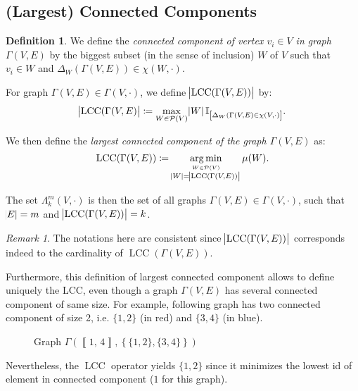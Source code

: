 \documentclass{article}
\theoremstyle{definition}
\newtheorem{definition}[lemma]{Definition}
\theoremstyle{remark}
\newtheorem*{remark}{Remark}
\DeclareMathOperator{\LCC}{LCC}
\DeclareMathOperator*{\argmin}{arg\,min}
\newcommand{\intint}[2]{\left\llbracket#1, \, #2\right\rrbracket}
\begin{document}
	\subsection{(Largest) Connected Components}
		\begin{definition} We define the \textit{connected component of vertex $v_i \in V$ in graph $\Gamma(V, E)$} by the biggest subset (in the sense of inclusion) $W$
		of $V$ such that $v_i \in W$ and $\Delta_W(\Gamma(V, E)) \in \chi(W, \cdot)$.

		For graph $\Gamma(V, E) \in \Gamma(V, \cdot)$, we define $\abs {\LCC(\Gamma(V, E))}$ by:
		\[\abs {\LCC(\Gamma(V, E)} \coloneqq \max_{W \in \mathcal P(V)}\abs W\mathbb I_{\left[\Delta_W(\Gamma(V, E) \in \chi(V, \cdot)\right]}.\]

		We then define the \textit{largest connected component of the graph $\Gamma(V, E)$} as:
		\[\LCC(\Gamma(V, E)) \coloneqq \argmin_{\stackrel {W \in \mathcal P(V)}{\abs W = \abs {\LCC(\Gamma(V, E))}}} \mu(W).\]

		The set $\Lambda_k^m(V, \cdot)$ is then the set of all graphs $\Gamma(V, E) \in \Gamma(V, \cdot)$, such that $\abs E = m$ and $\abs {\LCC(\Gamma(V, E))} = k$.
		\end{definition}

		\begin{remark} The notations here are consistent since $\abs {\LCC(\Gamma(V, E))}$ corresponds indeed to the cardinality of $\LCC(\Gamma(V, E))$.

		Furthermore, this definition of largest connected component allows to define uniquely the LCC, even though a graph $\Gamma(V, E)$ has several connected component
		of same size. For example, following graph has two connected component of size 2, i.e. $\{1, 2\}$ (in red) and $\{3, 4\}$ (in blue).

		\begin{figure}[H]
		\begin{center}
		\end{center}
		\caption{Graph $\Gamma\left(\intint 14, \left\{\{1, 2\}, \{3, 4\}\right\}\right)$}
		\end{figure}

		Nevertheless, the $\LCC$ operator yields $\{1, 2\}$ since it minimizes the lowest id of element in connected component ($1$ for this graph).
		\end{remark}
\end{document}
